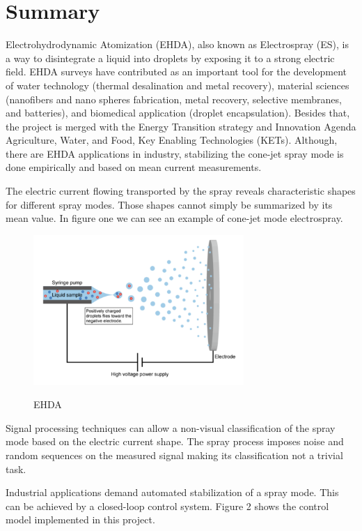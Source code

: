\section{Summary}

        Electrohydrodynamic Atomization (EHDA), also known as Electrospray (ES), is a way to disintegrate a liquid into droplets by exposing it to a strong electric field.
EHDA surveys have contributed as an important tool for the development of water technology (thermal desalination and metal recovery), material sciences (nanofibers and nano spheres fabrication, metal recovery, selective membranes, and batteries), and biomedical application (droplet encapsulation).
Besides that, the project is merged with the Energy Transition strategy and Innovation Agenda Agriculture, Water, and Food, Key Enabling Technologies (KETs). 
Although, there are EHDA applications in industry, stabilizing the cone-jet spray mode is done empirically and based on mean current measurements. 

The electric current flowing transported by the spray reveals characteristic shapes for different spray modes.
Those shapes cannot simply be summarized by its mean value. In figure one we can see an example of cone-jet mode electrospray.

\begin{figure}[H]
    \center
    \includegraphics[width=8cm]{images/electrospray.png}
    \label{img1}
    \caption{EHDA}
\end{figure}

Signal processing techniques can allow a non-visual classification of the spray mode based on the electric current shape.
The spray process imposes noise and random sequences on the measured signal making its classification not a trivial task. 

Industrial applications demand automated stabilization of a spray mode.
This can be achieved by a closed-loop control system. Figure 2 shows the control model implemented in this project.


